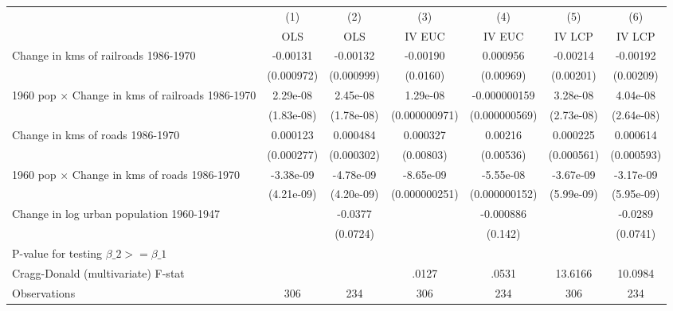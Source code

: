{
\def\sym#1{\ifmmode^{#1}\else\(^{#1}\)\fi}
\begin{tabular}{l*{6}{c}}
\hline\hline
                &\multicolumn{1}{c}{(1)}&\multicolumn{1}{c}{(2)}&\multicolumn{1}{c}{(3)}&\multicolumn{1}{c}{(4)}&\multicolumn{1}{c}{(5)}&\multicolumn{1}{c}{(6)}\\
                &\multicolumn{1}{c}{OLS}&\multicolumn{1}{c}{OLS}&\multicolumn{1}{c}{IV EUC}&\multicolumn{1}{c}{IV EUC}&\multicolumn{1}{c}{IV LCP}&\multicolumn{1}{c}{IV LCP}\\
\hline
Change in kms of railroads 1986-1970& -0.00131         & -0.00132         & -0.00190         & 0.000956         & -0.00214         & -0.00192         \\
                &(0.000972)         &(0.000999)         & (0.0160)         &(0.00969)         &(0.00201)         &(0.00209)         \\
[1em]
1960 pop $\times$ Change in kms of railroads 1986-1970& 2.29e-08         & 2.45e-08         & 1.29e-08         &-0.000000159         & 3.28e-08         & 4.04e-08         \\
                &(1.83e-08)         &(1.78e-08)         &(0.000000971)         &(0.000000569)         &(2.73e-08)         &(2.64e-08)         \\
[1em]
Change in kms of roads 1986-1970& 0.000123         & 0.000484         & 0.000327         &  0.00216         & 0.000225         & 0.000614         \\
                &(0.000277)         &(0.000302)         &(0.00803)         &(0.00536)         &(0.000561)         &(0.000593)         \\
[1em]
1960 pop $\times$ Change in kms of roads 1986-1970&-3.38e-09         &-4.78e-09         &-8.65e-09         &-5.55e-08         &-3.67e-09         &-3.17e-09         \\
                &(4.21e-09)         &(4.20e-09)         &(0.000000251)         &(0.000000152)         &(5.99e-09)         &(5.95e-09)         \\
[1em]
Change in log urban population 1960-1947&                  &  -0.0377         &                  &-0.000886         &                  &  -0.0289         \\
                &                  & (0.0724)         &                  &  (0.142)         &                  & (0.0741)         \\
\hline
P-value for testing $\beta\_{2} >= \beta\_{1}$&                  &                  &                  &                  &                  &                  \\
Cragg-Donald (multivariate) F-stat&                  &                  &    .0127         &    .0531         &  13.6166         &  10.0984         \\
Observations    &      306         &      234         &      306         &      234         &      306         &      234         \\
\hline\hline
\end{tabular}
}
